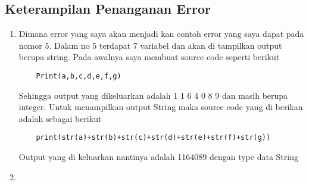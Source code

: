\subsection{Keterampilan Penanganan Error}
\begin{enumerate}
	\item Dimana error yang saya akan menjadi kan contoh error yang saya dapat pada nomor 5. Dalam no 5 terdapat 7 variabel dan akan di tampilkan output berupa string. Pada awalnya saya membuat source code seperti berikut
	
	\begin{verbatim}
	Print(a,b,c,d,e,f,g)
	\end{verbatim}

	Sehingga output yang dikeluarkan adalah 1 1 6 4 0 8 9 dan masih berupa integer. Untuk menampilkan output String maka source code yang di berikan adalah sebagai berikut 
	
	\begin{verbatim}
	print(str(a)+str(b)+str(c)+str(d)+str(e)+str(f)+str(g))
	\end{verbatim}

	Output yang di keluarkan nantinya adalah 1164089 dengan type data String


	\item 
\end{enumerate}


	